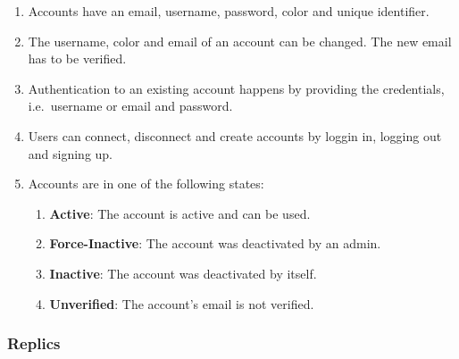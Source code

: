 \begin{enumerate}[label=\textit{AC \arabic*}]
    \item \label{ac:accounts:1} Accounts have an email, username, password, color and unique identifier.
    \item \label{ac:accounts:2} The username, color and email of an account can be changed.
    The new email has to be verified.
    \item \label{ac:accounts:3} Authentication to an existing account happens by providing the credentials, i.e.\ username or email and password.
    \item \label{ac:accounts:4} Users can connect, disconnect and create accounts by loggin in, logging out and signing up.
    \item \label{ac:accounts:5} Accounts are in one of the following states:
    \begin{enumerate}
        \item \textbf{Active}: The account is active and can be used.
        \item \textbf{Force-Inactive}: The account was deactivated by an admin.
        \item \textbf{Inactive}: The account was deactivated by itself.
        \item \textbf{Unverified}: The account's email is not verified.
    \end{enumerate}
\end{enumerate}

\subsubsection{Replics}

